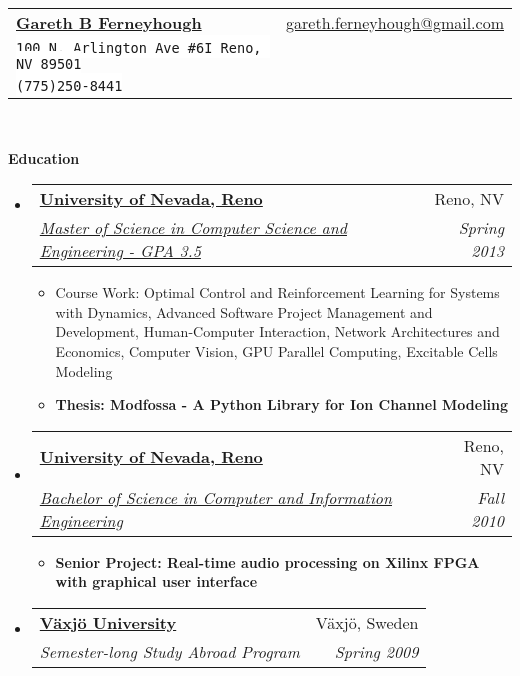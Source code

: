 \documentclass[letterpaper,11pt]{article}
\makeatletter
\newcommand{\resitem}[1]{\item #1 \vspace{-2pt}}
\newcommand{\resheading}[1]{{\large \colorbox{mygrey}{\begin{minipage}{\textwidth}{\textbf{#1 \vphantom{p\^{E}}}}\end{minipage}}}}
\newcommand{\ressubheading}[4]{
\begin{tabular*}{6.5in}{l@{\extracolsep{\fill}}r}
		\textbf{#1} & #2 \\
		\textit{#3} & \textit{#4} \\
\end{tabular*}\vspace{-6pt}}
\makeatother
\begin{document}
\newcommand{\mywebheader}{
\begin{tabular*}{7in}{l@{\extracolsep{\fill}}r}
	\textbf{\href{http://gferneyhough.com/}{\LARGE Gareth B Ferneyhough}} & \href{mailto:gareth.ferneyhough@gmail.com}{gareth.ferneyhough@gmail.com}\\
	{\footnotesize \texttt{\colorbox{white}{100 N. Arlington Ave \#6I Reno, NV 89501}}} &  \\
	{\footnotesize \texttt{\colorbox{white}{(775)250-8441}}}
	\end{tabular*}
\\
\vspace{0.1in}}

\mywebheader

\resheading{Education}
	\begin{itemize}
		\item
			\ressubheading{\href{http://www.unr.edu/}{University of Nevada, Reno}}{Reno, NV}{\href{http://www.cse.unr.edu/academics/graduate/cesms.html}{Master of Science in Computer Science and Engineering - GPA 3.5}}{Spring 2013}
				{ \footnotesize
				\begin{itemize}
				  \resitem{Course Work: Optimal Control and Reinforcement Learning for Systems with Dynamics, Advanced Software Project Management and Development, Human-Computer Interaction, Network Architectures and Economics, Computer Vision, GPU Parallel Computing, Excitable Cells Modeling}  
				  \resitem{\textbf{Thesis: Modfossa - A Python Library for Ion Channel Modeling}}
				\end{itemize}
				}
		\item
			\ressubheading{\href{http://www.unr.edu/}{University of Nevada, Reno}}{Reno, NV}{\href{http://www.cse.unr.edu/academics/undergraduate/ciebs.html}{Bachelor of Science in Computer and Information Engineering}}{Fall 2010}
				{ \footnotesize
				\begin{itemize}
				  \resitem{\textbf{Senior Project: Real-time audio processing on Xilinx FPGA with graphical user interface}}
				\end{itemize}
				}
		\item
			\ressubheading{\href{http://lnu.se/?l=en}{V\"{a}xj\"{o} University}}{V\"{a}xj\"{o}, Sweden}{Semester-long Study Abroad Program}{Spring 2009}
	\end{itemize} %
\end{document}
